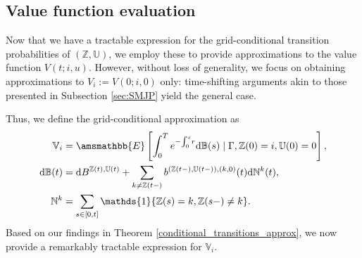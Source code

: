 \documentclass[11pt,leqno]{amsart}
\numberwithin{table}{section}
\numberwithin{figure}{section}
\numberwithin{equation}{section}
\newcommand{\dd}{\mathrm{d}}
\newcommand{\1}{{\mathds{1}}}
\newcommand{\0}{\mat{0}}
\newcommand{\E}{\amsmathbb{E}}
\newcommand{\ap}[1]{\mathbb{#1}}
\begin{document}
\subsection{Value function evaluation}

Now that we have a tractable expression for the grid-conditional transition probabilities of $(\ap{Z},\ap{U})$, we employ these to provide approximations to the value function $V(t; i,u)$. However, without loss of generality, we focus on obtaining approximations to {$V_{i}:=V(0; i,0)$} only: time-shifting arguments akin to those presented in Subsection \ref{sec:SMJP} yield the general case.

Thus, we define the grid-conditional approximation as
 \begin{align}
\ap{V}_i& = \E\left[\int_0^T e^{-{ \int_0^s}r}\dd \ap{B}(s) \mid \Gamma, { \ap{Z}(0)=i,\ap{U}(0)=0}\right], \\
\dd \ap{B}(t)&= \dd B^{\ap{Z}(t),\ap{U}(t)} + \sum_{k \neq \ap{Z}(t-)}b^{(\ap{Z}(t-),\ap{U}(t-)),(k,0)}(t) \dd \ap{N}^{k}(t), \\
\ap{N}^{k}& = \sum_{s\in[0,t]} \1\{\ap{Z}(s)=k,\ap{Z}(s-)\neq k\}.
\end{align}
Based on our findings in Theorem \ref{conditional_transitions_approx}, we now provide a remarkably tractable expression for $\ap{V}_i$.

\end{document}

